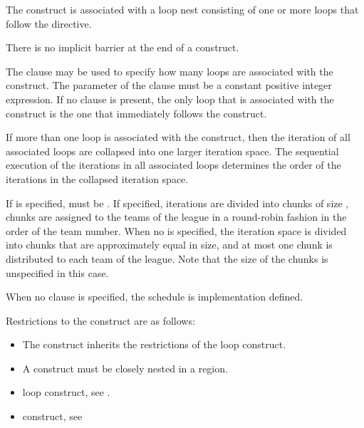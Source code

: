 \descr
The  construct is associated with a loop nest consisting of one or more 
loops that follow the directive.

There is no implicit barrier at the end of a  construct.

The  clause may be used to specify how many loops are associated with the 
 construct. The parameter of the  clause must be a constant 
positive integer expression. If no  clause is present, the only loop that is 
associated with the  construct is the one that immediately follows the 
 construct.

If more than one loop is associated with the  construct, then the iteration 
of all associated loops are collapsed into one larger iteration space. The sequential 
execution of the iterations in all associated loops determines the order of the iterations in 
the collapsed iteration space.

If  is specified,  must be . If specified, iterations are 
divided into chunks of size , chunks are assigned to the teams of the league in 
a round-robin fashion in the order of the team number. When no  is specified, 
the iteration space is divided into chunks that are approximately equal in size, and at 
most one chunk is distributed to each team of the league. Note that the size of the 
chunks is unspecified in this case.

When no  clause is specified, the schedule is implementation defined.

\restrictions
Restrictions to the  construct are as follows:

\begin{itemize}
\item The  construct inherits the restrictions of the loop construct.

\item A  construct must be closely nested in a  region. 
\end{itemize}

\crossreferences
\begin{itemize}
\item loop construct, see 
.

\item {} construct, see 
\end{itemize}










